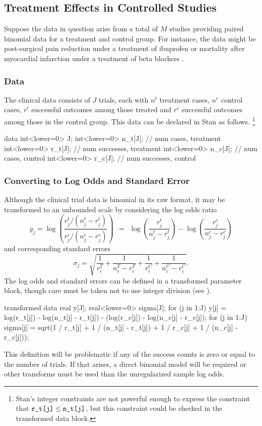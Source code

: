 \subsection{Treatment Effects in Controlled Studies}

Suppose the data in question arise from a total of $M$ studies
providing paired binomial data for a treatment and control group.  For
instance, the data might be post-surgical pain reduction under a treatment
of ibuprofen \citep{WarnThompsonSpiegelhalter:2002} or mortality after
myocardial infarction under a treatment of beta blockers
\citep[Section~5.6]{GelmanEtAl:2013}.

\subsubsection{Data}

The clinical data consists of $J$ trials, each with $n^t$ treatment
cases, $n^c$ control cases, $r^t$ successful outcomes among those treated and
$r^c$ successful outcomes among those in the control group.  This data
can be declared in Stan as follows.%
%
\footnote{Stan's integer constraints are not powerful enough to express the
constraint that $\mbox{\code{r\_t[j]}} \leq \mbox{\code{n\_t[j]}}$,
but this constraint could be checked in the transformed data block.}
%
\begin{stancode}
data {
  int<lower=0> J;
  int<lower=0> n_t[J];  // num cases, treatment
  int<lower=0> r_t[J];  // num successes, treatment
  int<lower=0> n_c[J];  // num cases, control
  int<lower=0> r_c[J];  // num successes, control
}
\end{stancode}
%

\subsubsection{Converting to Log Odds and Standard Error}

Although the clinical trial data is binomial in its raw format, it may
be transformed to an unbounded scale by considering the log odds ratio
\[
y_j = \log \left( \frac{r^t_j / (n^t_j - r^t_j)}
                       {r^c_j / (n^c_j - r^c_j)} \right)
\ \ = \ \ 
\log \left( \frac{r^t_j}{n^t_j - r^t_j} \right)
- 
\log \left( \frac{r^c_j}{n^c_j - r^c_j} \right)
\]
and corresponding standard errors
\[
\sigma_j = \sqrt{
\frac{1}{r^T_i} 
+ \frac{1}{n^T_i - r^T_i}
+ \frac{1}{r^C_i} 
+ \frac{1}{n^C_i - r^C_i}
}.
\]
%
The log odds and standard errors can be defined in a
transformed parameter block, though care must be taken not to use
integer division (see \refsection{int-arithmetic}).
%
\begin{stancode}
transformed data {
  real y[J];
  real<lower=0> sigma[J];
  for (j in 1:J) 
    y[j] = log(r_t[j]) - log(n_t[j] - r_t[j])
            - (log(r_c[j]) - log(n_c[j] - r_c[j]);
  for (j in 1:J)
    sigma[j] = sqrt(1 / r_t[j] + 1 / (n_t[j] - r_t[j])
                     + 1 / r_c[j] + 1 / (n_c[j] - r_c[j]));
}
\end{stancode}
%
This definition will be problematic if any of the success counts is 
zero or equal to the number of trials.
If that arises, a direct binomial model will be required or other
transforms must be used than the unregularized sample log odds.

